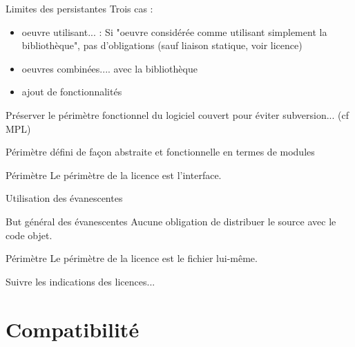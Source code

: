 \documentclass{beamer}
\begin{document}
\begin{frame}{Limites des persistantes}
Trois cas :
  \begin{itemize}
  \item oeuvre utilisant... : Si "oeuvre considérée comme utilisant simplement la bibliothèque", pas
    d'obligations (sauf liaison statique, voir licence)
  \item oeuvres combinées.... avec la bibliothèque
  \item ajout de fonctionnalités
  \end{itemize}

Préserver le périmètre fonctionnel du logiciel couvert pour éviter subversion... (cf MPL)

Périmètre défini de façon abstraite et fonctionnelle en termes de modules
 \begin{alertblock}{Périmètre}
    Le périmètre de la licence est l'interface.
  \end{alertblock}
  
\end{frame}


\begin{frame}{Utilisation des évanescentes}

  \begin{block}{But général des évanescentes}
    Aucune obligation de distribuer le source avec le code objet.
  \end{block}

  \begin{alertblock}{Périmètre}
    Le périmètre de la licence est le fichier lui-même.
  \end{alertblock}

  Suivre les indications des licences...

\end{frame}



\section{Compatibilité}
\end{document}
